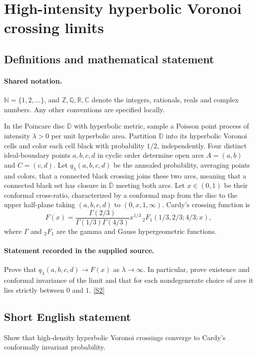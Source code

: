\documentclass[11pt]{article}
\newcommand{\sref}[2]{\hyperlink{source:#1:#2}{[S#2]}}
\begin{document}
\section{High-intensity hyperbolic Voronoi crossing limits}\label{statement}

\subsection{Definitions and mathematical statement}

\paragraph{Shared notation.}$\mathbb N=\{1,2,\ldots\}$, and $\mathbb Z,\mathbb Q,\mathbb R,\mathbb C$ denote the integers, rationals, reals and complex numbers. Any other conventions are specified locally.


In the Poincare disc $\mathbb D$ with hyperbolic metric, sample a Poisson point process of intensity $\lambda>0$ per unit hyperbolic area. Partition $\mathbb D$ into its hyperbolic Voronoi cells and color each cell black with probability $1/2$, independently. Four distinct ideal-boundary points $a,b,c,d$ in cyclic order determine open arcs $A=(a,b)$ and $C=(c,d)$. Let $q_\lambda(a,b,c,d)$ be the annealed probability, averaging points and colors, that a connected black crossing joins these two arcs, meaning that a connected black set has closure in $\overline{\mathbb D}$ meeting both arcs.
Let $x\in(0,1)$ be their conformal cross-ratio, characterized by a conformal map from the disc to the upper half-plane taking $(a,b,c,d)$ to $(0,x,1,\infty)$. Cardy's crossing function is
\[F(x)=\frac{\Gamma(2/3)}{\Gamma(1/3)\Gamma(4/3)}x^{1/3}\,{}_2F_1(1/3,2/3;4/3;x),\]
where $\Gamma$ and ${}_2F_1$ are the gamma and Gauss hypergeometric functions.
\paragraph{Statement recorded in the supplied source.}
Prove that $q_\lambda(a,b,c,d)\to F(x)$ as $\lambda\to\infty$. In particular, prove existence and conformal invariance of the limit and that for each nondegenerate choice of arcs it lies strictly between $0$ and $1$. \sref{statement}{2}
\subsection{Short English statement}
Show that high-density hyperbolic Voronoi crossings converge to Cardy's conformally invariant probability.
\end{document}
